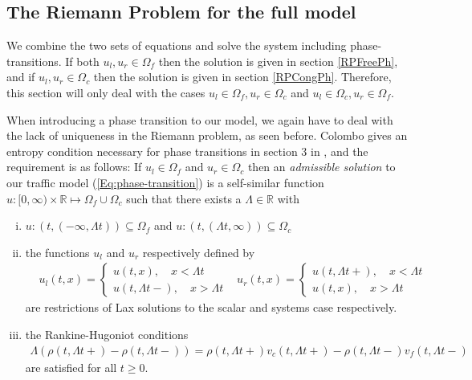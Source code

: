 \documentclass[10pt]{article}
\numberwithin{equation}{section}
\begin{document}
\newpage

\subsection{The Riemann Problem for the full model}
We combine the two sets of equations and solve the system including phase-transitions. If both $u_l, u_r \in \Omega_f$ then the solution is given in section \ref{RPFreePh}, and if $u_l, u_r \in \Omega_c$ then the solution is given in section \ref{RPCongPh}. Therefore, this section will only deal with the cases $u_l \in \Omega_f, u_r \in \Omega_c$ and $u_l \in \Omega_c, u_r \in \Omega_f$.

When introducing a phase transition to our model, we again have to deal with the lack of uniqueness in the Riemann problem, as seen before. Colombo gives an entropy condition necessary for phase transitions in section 3 in \cite{Colombo2003}, and the requirement is as follows: If $u_l \in \Omega_f$ and $u_r \in \Omega_c$ then an \textit{admissible solution} to our traffic model (\ref{Eq:phase-transition}) is a self-similar function $u:[0, \infty) \times \mathbb{R} \mapsto \Omega_f \cup \Omega_c$ such that there exists a $\Lambda \in \mathbb{R}$ with 
\begin{enumerate}[i)]
    \item $u:(t, (-\infty,\Lambda t)) \subseteq \Omega_f $ and $u:(t, (\Lambda t, \infty)) \subseteq \Omega_c $ 
    \item the functions $u_l$ and $u_r$ respectively defined by \begin{align*}
        & u_l(t,x) = \begin{cases}
        u(t,x),  \quad x < \Lambda t\\
        u(t,\Lambda t-),\quad x > \Lambda t
        \end{cases}
        & u_r(t,x) = \begin{cases}
        u(t,\Lambda t+), \quad x < \Lambda t\\
        u(t,x), \quad x > \Lambda t
        \end{cases}
    \end{align*} are restrictions of Lax solutions to the scalar and systems case respectively. 
    \item the Rankine-Hugoniot conditions 
    \begin{align}
        \Lambda (\rho (t,\Lambda t+) - \rho (t,\Lambda t-)) = \rho (t,\Lambda t+) v_c(t,\Lambda t+) - \rho (t,\Lambda t-) v_f(t,\Lambda t-)
        \label{Eq:RH_PhT}
    \end{align} are satisfied for all $t \geq 0$.
\end{enumerate}
\end{document}
